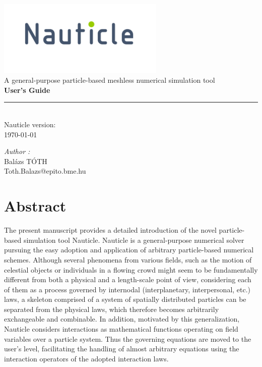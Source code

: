 \documentclass[a4paper,12pt,openany]{book}
\theoremstyle{break}
\begin{document}
\frontmatter
\begin{titlepage}
\begin{center}
\vspace{5cm}
\includegraphics[width=0.6\textwidth]{nauticle_logo.pdf}\\[0.5cm]
{\large A general-purpose particle-based meshless numerical simulation tool}\\ [5cm]
{ \huge \bfseries User's Guide \\[0.2cm] }
\color{nauticlegreen}
\rule{\linewidth}{1.5mm} \\[0.5cm]
\color{black}
{\large Nauticle version: \nauticleversion{} \\ \today}
\vfill
\noindent
\begin{minipage}{1\textwidth}
  \begin{flushright} \large
    \emph{Author :}\\
    Balázs TÓTH \\
    Toth.Balazs@epito.bme.hu
  \end{flushright}
\end{minipage}
\end{center}
\end{titlepage}
\clearpage\mbox{}\clearpage
\chapter{Abstract}
The present manuscript provides a detailed introduction of the novel particle-based simulation tool Nauticle. Nauticle is a general-purpose numerical solver pursuing the easy adoption and application of arbitrary particle-based numerical schemes. Although several phenomena from various fields, such as the motion of celestial objects or individuals in a flowing crowd might seem to be fundamentally different from both a physical and a length-scale point of view, considering each of them as a process governed by internodal (interplanetary, interpersonal, etc.) laws, a skeleton comprised of a system of spatially distributed particles can be separated from the physical laws, which therefore becomes arbitrarily exchangeable and combinable. In addition, motivated by this generalization, Nauticle considers interactions as mathematical functions operating on field variables over a particle system. Thus the governing equations are moved to the user's level, facilitating the handling of almost arbitrary equations using the interaction operators of the adopted interaction laws.
\end{document}
